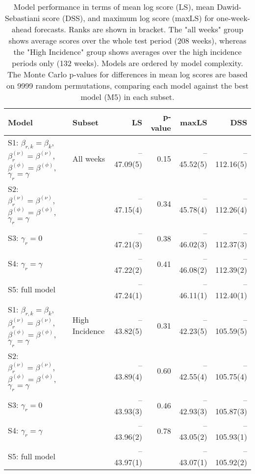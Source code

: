 \begin{table}[ht]
\centering
\begingroup\fontsize{9pt}{10pt}\selectfont
\begin{tabular}{ll|rrrr}
  \hline
Model & Subset & LS & p-value & maxLS & DSS \\ 
  \hline
S1: $\beta_{r,k} = \beta_{k}$, $\beta_{r}^{(\nu)} = \beta^{(\nu)}$, $\beta^{(\phi)} = \beta^{(\phi)}$, $\gamma_r = \gamma$ & All weeks & --47.09(5) & 0.15 & --45.52(5) & --112.16(5) \\ 
  S2: $\beta_{r}^{(\nu)} = \beta^{(\nu)}$, $\beta^{(\phi)} = \beta^{(\phi)}$, $\gamma_r = \gamma$ &  & --47.15(4) & 0.34 & --45.78(4) & --112.26(4) \\ 
  S3: $\gamma_r = 0$ &  & --47.21(3) & 0.38 & --46.02(3) & --112.37(3) \\ 
  S4: $\gamma_r = \gamma$ &  & --47.22(2) & 0.41 & --46.08(2) & --112.39(2) \\ 
  S5: full model &  & --47.24(1) &  & --46.11(1) & --112.40(1) \\ 
   \hline
S1: $\beta_{r,k} = \beta_{k}$, $\beta_{r}^{(\nu)} = \beta^{(\nu)}$, $\beta^{(\phi)} = \beta^{(\phi)}$, $\gamma_r = \gamma$ & High Incidence & --43.82(5) & 0.31 & --42.23(5) & --105.59(5) \\ 
  S2: $\beta_{r}^{(\nu)} = \beta^{(\nu)}$, $\beta^{(\phi)} = \beta^{(\phi)}$, $\gamma_r = \gamma$ &  & --43.89(4) & 0.60 & --42.55(4) & --105.75(4) \\ 
  S3: $\gamma_r = 0$ &  & --43.93(3) & 0.46 & --42.93(3) & --105.87(3) \\ 
  S4: $\gamma_r = \gamma$ &  & --43.96(2) & 0.78 & --43.05(2) & --105.93(1) \\ 
  S5: full model &  & --43.97(1) &  & --43.07(1) & --105.92(2) \\ 
   \hline
\end{tabular}
\endgroup
\caption{Model performance in terms of mean log score (LS),
             mean Dawid-Sebastiani score (DSS), and maximum log score (maxLS)
             for one-week-ahead forecasts.
             Ranks are shown in bracket.
             The "all weeks" group shows average scores over the
             whole test period (208 weeks),
             whereas the "High Incidence" group shows
             averages over the high incidence periods only (132 weeks).
             Models are ordered by model complexity.
             The Monte Carlo p-values for differences in mean log scores
             are based on 9999 random permutations,
             comparing each model against the best model (M5) in each subset.} 
\label{tab:forecast}
\end{table}
